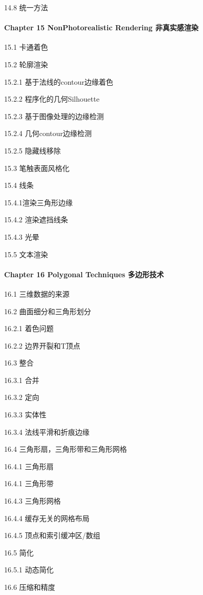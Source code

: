 \documentclass[
  paper=a4,
  ,captions=tableheading
]{scrartcl}
\begin{document}
14.8 统一方法

\paragraph{Chapter 15 NonPhotorealistic Rendering
非真实感渲染}\label{chapter-15-nonphotorealistic-rendering-ux975eux771fux5b9eux611fux6e32ux67d3}

15.1 卡通着色

15.2 轮廓渲染

15.2.1 基于法线的contour边缘着色

15.2.2 程序化的几何Silhouette

15.2.3 基于图像处理的边缘检测

15.2.4 几何contour边缘检测

15.2.5 隐藏线移除

15.3 笔触表面风格化

15.4 线条

15.4.1渲染三角形边缘

15.4.2 渲染遮挡线条

15.4.3 光晕

15.5 文本渲染

\paragraph{Chapter 16 Polygonal Techniques
多边形技术}\label{chapter-16-polygonal-techniques-ux591aux8fb9ux5f62ux6280ux672f}

16.1 三维数据的来源

16.2 曲面细分和三角形划分

16.2.1 着色问题

16.2.2 边界开裂和T顶点

16.3 整合

16.3.1 合并

16.3.2 定向

16.3.3 实体性

16.3.4 法线平滑和折痕边缘

16.4 三角形扇，三角形带和三角形网格

16.4.1 三角形扇

16.4.1 三角形带

16.4.3 三角形网格

16.4.4 缓存无关的网格布局

16.4.5 顶点和索引缓冲区/数组

16.5 简化

16.5.1 动态简化

16.6 压缩和精度
\end{document}
